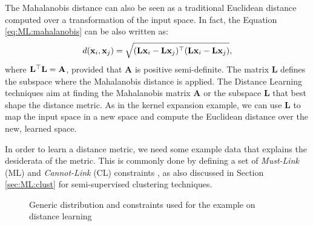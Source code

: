 The Mahalanobis distance can also be seen as a traditional Euclidean distance computed over a transformation of the input space. In fact, the Equation \ref{eq:ML:mahalanobis} can be also written as:
\begin{equation}
d(\mathbf{x}_i,\mathbf{x}_j)=\sqrt{(\mathbf{L}\mathbf{x}_i-\mathbf{L}\mathbf{x}_j)^\top (\mathbf{L}\mathbf{x}_i-\mathbf{L}\mathbf{x}_j)},
\end{equation}
where $\mathbf{L}^\top \mathbf{L}=\mathbf{A}$, provided that $\mathbf{A}$ is positive semi-definite. The matrix $\mathbf{L}$ defines the subspace where the Mahalanobis distance is applied. The Distance Learning techniques aim at finding the Mahalanobis matrix $\mathbf{A}$ or the subspace $\mathbf{L}$ that best shape the distance metric. As in the kernel expansion example, we can use $\mathbf{L}$ to map the input space in a new space and compute the Euclidean distance over the new, learned space.

In order to learn a distance metric, we need some example data that explains the desiderata of the metric. This is commonly done by defining a set of \textit{Must-Link} (ML) and \textit{Cannot-Link} (CL) constraints \cite{xing2003distance}, as also discussed in Section \ref{sec:ML:clust} for semi-supervised clustering techniques. 


\begin{figure}[tb]
	\centering
	 \hfil
	\caption{Generic distribution and constraints used for the example on distance learning}
	\label{fig:ML:DL_OC}         
\end{figure}

